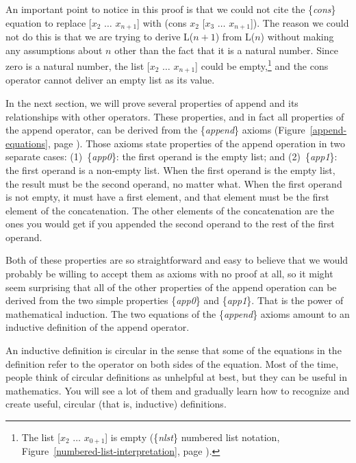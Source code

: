 An important point to notice in this proof is that
we could not cite the \{\emph{cons}\} equation to replace \textsf{[$x_2$ $\dots$ $x_{n+1}$]}
with \textsf{(cons $x_2$ [$x_3$ $\dots$ $x_{n+1}$])}.
The reason we could not do this is that we are trying to derive
L($n+1$) from L($n$) without making any assumptions about $n$
other than the fact that it is a natural number.
Since zero is a natural number, the list \textsf{[$x_2$ $\dots$ $x_{n+1}$]}
could be empty,\footnote{The list [$x_2$ $\dots$ $x_{0+1}$] is empty
(\{\emph{nlst}\} numbered list notation,
Figure~\ref{numbered-list-interpretation}, page \pageref{numbered-list-interpretation}).}
and the \textsf{cons} operator cannot deliver an empty list as its value.

In the next section, we will prove several properties of \textsf{append}
and its relationships with other operators.
These properties, and in fact all properties of the \textsf{append} operator,
can be derived from the \{\emph{append}\} axioms
(Figure~\ref{append-equations}, page \pageref{append-equations}).
Those axioms state properties of the append operation in two separate cases:
(1)~\{\emph{app0}\}: the first operand is the empty list; and
(2)~\{\emph{app1}\}: the first operand is a non-empty list.
When the first operand is the empty list,
the result must be the second operand, no matter what.
When the first operand is not empty, it must have a first element,
and that element must be the first element of the concatenation.
The other elements of the concatenation are the ones you would get
if you appended the second operand to the rest of the first operand.

Both of these properties are so straightforward and easy to believe
that we would probably be willing to accept them as axioms with no proof at all,
so it might seem surprising that all of the other properties
of the \textsf{append} operation can be derived from
the two simple properties \{\emph{app0}\} and \{\emph{app1}\}.
That is the power of mathematical induction.
The two equations of the \{\emph{append}\} axioms
amount to an inductive definition of the \textsf{append} operator.

An inductive definition is circular in the sense
that some of the equations in the definition refer
to the operator on both sides of the equation.
Most of the time, people think of circular definitions
as unhelpful at best,
but they can be useful in mathematics.
You will see a lot of them and
gradually learn how to recognize and create useful,
circular (that is, inductive) definitions.

